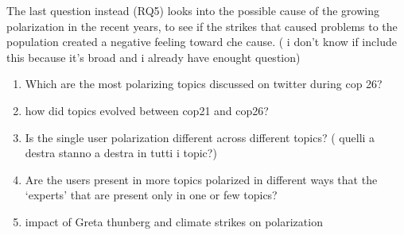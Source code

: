 The last question instead (RQ5) looks into the possible cause of the growing polarization in the recent years, to see if the strikes that caused problems to the population created a negative feeling toward che cause. ( i don't know if include this because it's broad and i already have enought question)

\begin{enumerate}
    \item  Which are the most polarizing topics discussed on twitter during cop 26?
    \item how did topics evolved between cop21 and cop26?
    \item Is the single user polarization different across different topics? ( quelli a destra stanno  a destra in tutti i topic?)
    \item Are the users present in more topics polarized in different ways that the ‘experts’ that are present only in one or few topics?
    \item impact of Greta thunberg and climate strikes on polarization
\end{enumerate}







